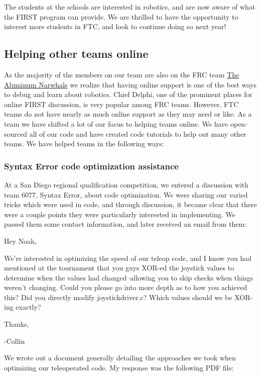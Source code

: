 The students at the schools are interested in robotics, and are now aware of what the FIRST program can provide. We are thrilled to have the opportunity to interest more students in FTC, and look to continue doing so next year!

\subsection{Helping other teams online}
As the majority of the members on our team are also on the FRC team \underline{The Aluminum Narwhals} we realize that having online support is one of the best ways to debug and learn about robotics. Chief Delphi, one of the prominent places for online FIRST discussion, is very popular among FRC teams. However, FTC teams do not have nearly as much online support as they may need or like. As a team we have shifted a lot of our focus to helping teams online. We have open-sourced all of our code and have created code tutorials to help out many other teams. We have helped teams in the following ways:

\subsubsection{Syntax Error code optimization assistance}

At a San Diego regional qualification competition, we entered a discussion with team 6077, Syntax Error, about code optimization. We were sharing our varied tricks which were used in code, and through discussion, it became clear that there were a couple points they were particularly interested in implementing. We passed them some contact information, and later received an email from them:

\begin{fancyquotes}
Hey Noah,

We're interested in optimizing the speed of our teleop code, and I know you had mentioned at the tournament that you guys XOR-ed the joystick values to determine when the values had changed--allowing you to skip checks when things weren't changing. Could you please go into more depth as to how you achieved this? Did you directly modify joystickdriver.c? Which values should we be XOR-ing exactly?

Thanks,

-Collin 
\end{fancyquotes}

We wrote out a document generally detailing the approaches we took when optimizing our teleoperated code. My response was the following PDF file:

